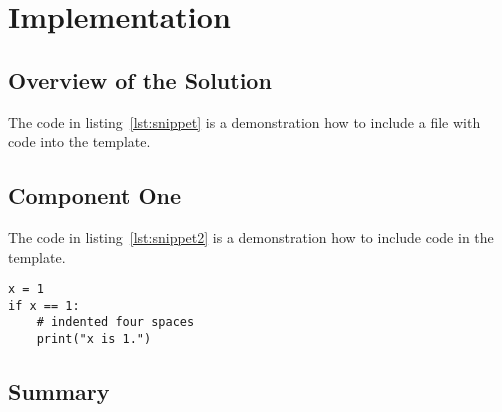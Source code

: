 \chapter{Implementation}

\lstset{language=Python, captionpos=b, frame=single}
\captionsetup{width=.8\linewidth} 


\section{Overview of the Solution}



The code in listing~\ref{lst:snippet} is a demonstration how to include a file with code into the template.



\section{Component One}

The code in listing~\ref{lst:snippet2} is a demonstration how to include code in the template.

\begin{lstlisting}[caption={[Sample Code 2]Second Lengthy caption}, label={lst:snippet2}]
x = 1
if x == 1:
    # indented four spaces
    print("x is 1.")
\end{lstlisting}



\section{Summary}


